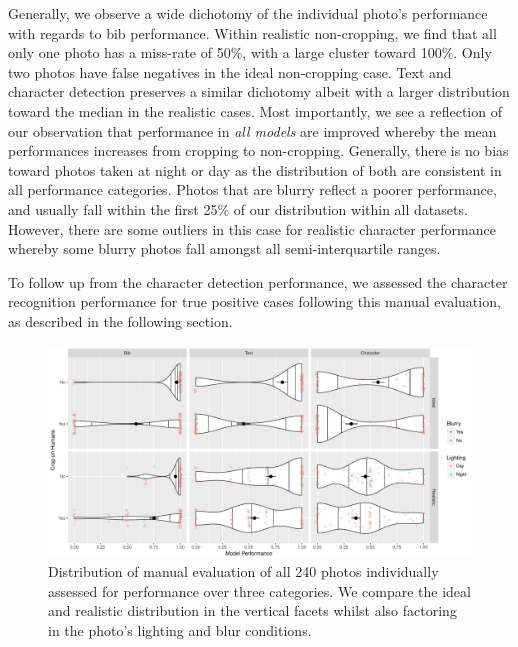 Generally, we observe a wide dichotomy of the individual photo's performance with regards to bib performance. Within realistic non-cropping, we find that all only one photo has a miss-rate of 50\%, with a large cluster toward 100\%. Only two photos have false negatives in the ideal non-cropping case. Text and character detection preserves a similar dichotomy albeit with a larger distribution toward the median in the realistic cases. Most importantly, we see a reflection of our observation that performance in \textit{all models} are improved whereby the mean performances increases from cropping to non-cropping. Generally, there is no bias toward photos taken at night or day as the distribution of both are consistent in all performance categories. Photos that are blurry reflect a poorer performance, and usually fall within the first 25\% of our distribution within all datasets. However, there are some outliers in this case for realistic character performance whereby some blurry photos fall amongst all semi-interquartile ranges. 

To follow up from the character detection performance, we assessed the character recognition performance for true positive cases following this manual evaluation, as described in the following section.

\begin{landscape}

\begin{figure}
  \centering
  \includegraphics[width=1.20\paperwidth]{images/evaluation/mdets_all}
  \caption[Distribution of manual inspection evaluation]{Distribution of manual evaluation of all 240 photos individually assessed for performance over three categories. We compare the ideal and realistic distribution in the vertical facets whilst also factoring in the photo's lighting and blur conditions.}
  \label{fig:evaluation:results:mdets_all}
\end{figure}

\end{landscape}

